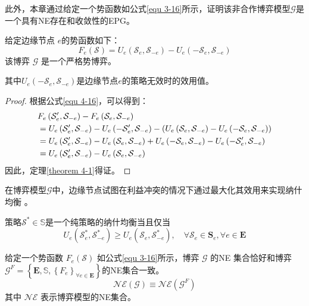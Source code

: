 此外，本章通过给定一个势函数如公式\ref{equ 3-16}所示，证明该非合作博弈模型$\mathcal{G}$是一个具有NE存在和收敛性的EPG。
\begin{theorem}
给定边缘节点 $e$的势函数如下：
\begin{equation}
	{F}_{e}\left(\mathcal{S}\right) = {U}_{e}\left(\mathcal{S}_{e}, \mathcal{S}_{-e}\right) - {U}_{e}\left(-\mathcal{S}_{e}, \mathcal{S}_{-e}\right)
	\label{equ 3-16}
\end{equation}
该博弈 $\mathcal{G}$ 是一个严格势博弈。
\label{theorem 4-1}
\end{theorem}
\noindent 其中${U}_{e}\left(-\mathcal{S}_{e}, \mathcal{S}_{-e}\right)$是边缘节点$e$的策略无效时的效用值。
\begin{proof} 根据公式\ref{equ 4-16}，可以得到：
\begin{align}
&{F}_{e}\left(\mathcal{{S}}^{\prime}_{e}, \mathcal{S}_{-e}\right) - {F}_{e}\left(\mathcal{S}_{e}, \mathcal{S}_{-e}\right) \notag \\
		&={U}_{e}\left(\mathcal{S}^{\prime}_{e}, \mathcal{S}_{-e}\right) - {U}_{e}\left(-\mathcal{S}^{\prime}_{e}, \mathcal{S}_{-e}\right) - \left( {U}_{e}\left(\mathcal{S}_{e}, \mathcal{S}_{-e}\right) - {U}_{e}\left(-\mathcal{S}_{e}, \mathcal{S}_{-e}\right) \right) \notag \\
		&={U}_{e}\left(\mathcal{S}^{\prime}_{e}, \mathcal{S}_{-e}\right) - {U}_{e}\left(\mathcal{S}_{e}, \mathcal{S}_{-e}\right) + {U}_{e}\left(-\mathcal{S}_{e}, \mathcal{S}_{-e}\right) - {U}_{e}\left(-\mathcal{S}^{\prime}_{e}, \mathcal{S}_{-e}\right) \notag \\
		&={U}_{e}\left(\mathcal{S}^{\prime}_{e}, \mathcal{S}_{-e}\right) - {U}_{e}\left(\mathcal{S}_{e}, \mathcal{S}_{-e}\right)
\end{align}
因此，定理\ref{theorem 4-1}得证。
\end{proof}
\noindent 在博弈模型$\mathcal{G}$中，边缘节点试图在利益冲突的情况下通过最大化其效用来实现纳什均衡 \cite{chew2016potential}。
\begin{definition}
策略$\mathcal{S}^{*} \in \mathbb{S}$是一个纯策略的纳什均衡\cite{chew2016potential}当且仅当
	\begin{equation}
		U_{e}\left(\mathcal{S}_{e}^{*}, \mathcal{S}_{-e}^{*}\right) \geq U_{e}\left(\mathcal{S}_{e}, \mathcal{S}_{-e}^{*}\right), \quad \forall \mathcal{S}_{e} \in \mathbf{S}_{e}, \forall e \in \mathbf{E}
	\end{equation}
\end{definition}
\begin{lemma}
	给定一个势函数 $F_{e}(\mathcal{S})$ 如公式\ref{equ 3-16}所示，博弈 $\mathcal{G}$ 的NE 集合恰好和博弈$\mathcal{G}^{F}=\left\{\mathbf{E}, \mathbb{S}, \left\{{F}_{e}\right\}_{\forall e \in \mathbf{E}} \right\}$的NE集合一致。
	\begin{equation}
		\mathcal{NE}(\mathcal{G}) \equiv \mathcal{NE}\left(\mathcal{G}^{F}\right)
	\end{equation}
	其中 $\mathcal{NE}$ 表示博弈模型的NE集合。
\label{lemma 4-1}
\end{lemma}
